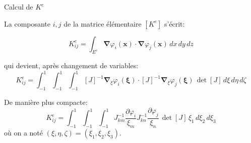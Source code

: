 \documentclass[
mode=present,    %
paper=a4paper,   %
orient=landscape,
display=slides,   %
size=10pt,     %
style=romain   %
]{powerdot}
\begin{document}
\begin{slide}{Calcul de $K^e$}

La composante $i,j$ de la matrice élémentaire $[K^e]$ s'écrit:

\begin{equation*}
    K^e_{ij} = \int_{E^e} \boldsymbol{\nabla} \varphi_i(\boldsymbol{x})\cdot
    \boldsymbol{\nabla} \varphi_j(\boldsymbol{x})  \, dx\,dy\,dz
\end{equation*}

qui devient, après changement de variables:
\begin{equation*}
    K^e_{ij} = \int_{-1}^1\int_{-1}^1\int_{-1}^1 [J]^{-1} \boldsymbol{\nabla}_{\xi} \varphi_i(\boldsymbol{\xi})\cdot
    [J]^{-1} \boldsymbol{\nabla}_{\xi} \varphi_j(\boldsymbol{\xi})  \, \det [J] \, d\xi\,d\eta\,d\zeta
\end{equation*}

\bigskip

De manière plus compacte:
\begin{equation*}
    K^e_{ij} = \int_{-1}^1\int_{-1}^1\int_{-1}^1 J_{km}^{-1} \frac{\partial\varphi_i}{\xi_m}
    J_{kn}^{-1} \frac{\partial\varphi_j}{\xi_n}  \, \det [J] \, \xi_1\,d\xi_2\,d\xi_3
\end{equation*}
où on a noté $(\xi, \eta, \zeta)=(\xi_1, \xi_2, \xi_3)$.

\end{slide}
\end{document}
